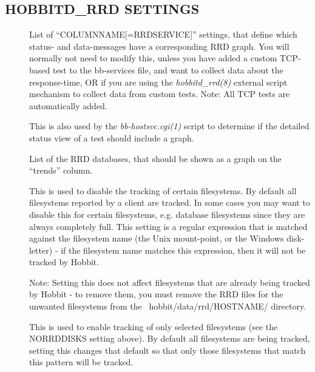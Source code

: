 \subsection{HOBBITD\_RRD SETTINGS}


 \begin{description}

\item[] List of ``COLUMNNAME[=RRDSERVICE]'' settings,
  that define which status- and data-messages have a corresponding RRD
  graph. You will normally not need to modify this, unless you have
  added a custom TCP-based test to the bb-services file, and want to
  collect data about the response-time, OR if you are using the
  \emph{hobbitd\_rrd(8)} external script mechanism to collect data
  from custom tests. Note: All TCP tests are automatically added. 



  This is also used by the \emph{bb-hostsvc.cgi(1) } script to
  determine if the detailed status view of a test should include a
  graph. 



 

\item[] List of the RRD databases, that should be shown
  as a graph on the ``trends'' column. 


 

\item[] This is used to disable the tracking of
  certain filesystems. By default all filesystems reported by a client
  are tracked. In some cases you may want to disable this for certain
  filesystems, e.g. database filesystems since they are always
  completely full. This setting is a regular expression that is
  matched against the filesystem name (the Unix mount-point, or the
  Windows disk-letter) - if the filesystem name matches this
  expression, then it will not be tracked by Hobbit.  

 Note: Setting this does not affect filesystems that are already being
 tracked by Hobbit - to remove them, you must remove the RRD files for
 the unwanted filesystems from the ~hobbit/data/rrd/HOSTNAME/
 directory. 


 

\item[] This is used to enable tracking of only
  selected filesystems (see the NORRDDISKS setting above). By default
  all filesystems are being tracked, setting this changes that default
  so that only those filesystems that match this pattern will be
  tracked. 


 


 


\end{description}

